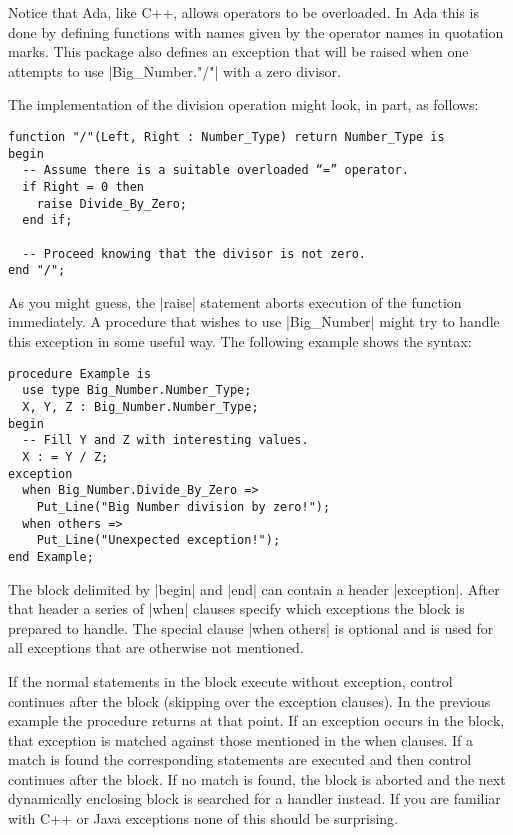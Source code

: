 Notice that Ada, like C++, allows operators to be overloaded. In Ada this is done by defining
functions with names given by the operator names in quotation marks. This package also defines
an exception that will be raised when one attempts to use |Big_Number."/"| with a zero divisor.

The implementation of the division operation might look, in part, as follows:

\begin{lstlisting}
function "/"(Left, Right : Number_Type) return Number_Type is
begin
  -- Assume there is a suitable overloaded “=” operator.
  if Right = 0 then
    raise Divide_By_Zero;
  end if;

  -- Proceed knowing that the divisor is not zero.
end "/";
\end{lstlisting}

As you might guess, the |raise| statement aborts execution of the function immediately. A
procedure that wishes to use |Big_Number| might try to handle this exception in some useful way.
The following example shows the syntax:

\begin{lstlisting}
procedure Example is
  use type Big_Number.Number_Type;
  X, Y, Z : Big_Number.Number_Type;
begin
  -- Fill Y and Z with interesting values.
  X : = Y / Z;
exception
  when Big_Number.Divide_By_Zero =>
    Put_Line("Big Number division by zero!");
  when others =>
    Put_Line("Unexpected exception!");
end Example;
\end{lstlisting}

The block delimited by |begin| and |end| can contain a header |exception|. After that header a
series of |when| clauses specify which exceptions the block is prepared to handle. The special
clause |when others| is optional and is used for all exceptions that are otherwise not
mentioned.

If the normal statements in the block execute without exception, control continues after the
block (skipping over the exception clauses). In the previous example the procedure returns at
that point. If an exception occurs in the block, that exception is matched against those
mentioned in the when clauses. If a match is found the corresponding statements are executed and
then control continues after the block. If no match is found, the block is aborted and the next
dynamically enclosing block is searched for a handler instead. If you are familiar with C++ or
Java exceptions none of this should be surprising.

